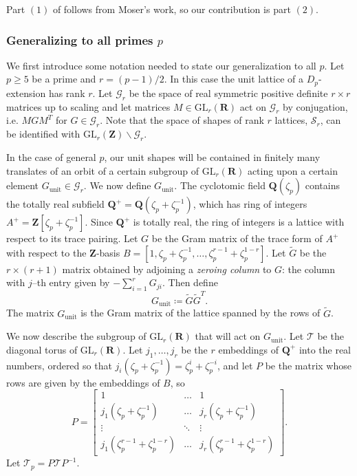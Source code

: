 \documentclass{amsart}
\newcommand{\QQ}{\mathbf{Q}}
\newcommand{\ZZ}{\mathbf{Z}}
\newcommand{\RR}{\mathbf{R}}
\newcommand{\mc}[1]{\mathcal{#1}}
\newcommand{\gl}{\mathrm{GL}}
\DeclareMathOperator{\unit}{unit}
\newcommand{\Sr}{\mc{S}}
\numberwithin{equation}{section}
\begin{document}
\noindent Part $(1)$ of  follows from Moser's work, so our contribution is part $(2)$.

\subsubsection{Generalizing to all primes $p$}

We first introduce some notation needed to state our generalization to all $p$. Let $p \geq 5$ be a prime and $r = (p-1)/2$. In this case the unit lattice of a $D_p$-extension has rank $r$. Let $\mathcal{G}_r$ be the space of real symmetric positive definite $r\times r$ matrices up to scaling and let matrices $M \in \gl_r(\RR)$ act on $\mathcal{G}_r$ by conjugation, i.e. $MGM^T$ for $G \in \mathcal{G}_r$. Note that the space of shapes of rank $r$ lattices, $\Sr_r$, can be identified with $\gl_r(\ZZ)\backslash \mathcal{G}_r$.

In the case of general $p$, our unit shapes will be contained in finitely many translates of an orbit of a certain subgroup of $\gl_r(\RR)$ acting upon a certain element $G_{\unit} \in \mathcal{G}_r$. We now define $G_{\unit}$.  The cyclotomic field $\QQ(\zeta_p)$ contains the totally real subfield $\QQ^+ = \QQ(\zeta_p+\zeta_p^{-1})$, which has ring of integers $A^+ = \ZZ[\zeta_p + \zeta_p^{-1}]$. Since $\QQ^+$ is totally real, the ring of integers is a lattice with respect to its trace pairing. Let $G$ be the Gram matrix of the trace form of $A^+$ with respect to the $\ZZ$-basis $B= [1, \zeta_p + \zeta_p^{-1}, \hdots, \zeta_p^{r-1} + \zeta_p^{1-r}]$. Let $\widetilde{G}$ be the $r\times (r+1)$ matrix obtained by adjoining a \emph{zeroing column} to $G$: the column with $j$--th entry given by $-\sum_{i=1}^{r} G_{ji}$. Then define 
	\[	G_{\unit} \coloneqq \widetilde{G}\widetilde{G}^T.	\]
The matrix $G_{\unit}$ is the Gram matrix of the lattice spanned by the rows of $\widetilde{G}$. 

We now describe the subgroup of $\gl_r(\RR)$ that will act on $G_{\unit}$. Let $\mathcal{T}$ be the diagonal torus of $\gl_r(\RR)$. Let $j_1,\dots,j_{r}$ be the $r$ embeddings of $\QQ^+$ into the real numbers, ordered so that $j_i(\zeta_p + \zeta_p^{-1}) = \zeta_p^i + \zeta_p^{-i}$, and let $P$ be the matrix whose rows are given by the embeddings of $B$, so
\[
    P = 
\begin{bmatrix}
    1       & \dots & 1 \\
    j_1(\zeta_p + \zeta_p^{-1})       & \dots & j_r(\zeta_p + \zeta_p^{-1}) \\
    \vdots &  \ddots & \vdots \\
    j_1(\zeta_p^{r-1} + \zeta_p^{1-r})       & \dots & j_r(\zeta_p^{r-1} + \zeta_p^{1-r})
\end{bmatrix}.
\]
Let $\mathcal{T}_p = P\mathcal{T}P^{-1}$. 
\end{document}
